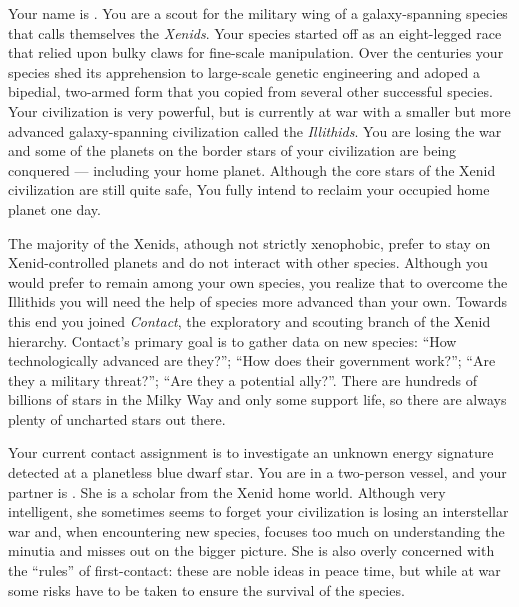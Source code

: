 \documentclass[char]{guildcamp1}
\begin{document}
\name{\cActive{}}

Your name is \cActive{\name}. You are a scout for the military wing of a galaxy-spanning species that calls themselves the \emph{Xenids}. Your species started off as an eight-legged race that relied upon bulky claws for fine-scale manipulation. Over the centuries your species shed its apprehension to large-scale genetic engineering and adoped a bipedial, two-armed form that you copied from several other successful species. Your civilization is very powerful, but is currently at war with a smaller but more advanced galaxy-spanning civilization called the \emph{Illithids}. You are losing the war and some of the planets on the border stars of your civilization are being conquered --- including your home planet. Although the core stars of the Xenid civilization are still quite safe, You fully intend to reclaim your occupied home planet one day.

The majority of the Xenids, athough not strictly xenophobic, prefer to stay on Xenid-controlled planets and do not interact with other species. Although you would prefer to remain among your own species, you realize that to overcome the Illithids you will need the help of species more advanced than your own. Towards this end you joined \emph{Contact}, the exploratory and scouting branch of the Xenid hierarchy. Contact's primary goal is to gather data on new species: ``How technologically advanced are they?''; ``How does their government work?''; ``Are they a military threat?''; ``Are they a potential ally?''. There are hundreds of billions of stars in the Milky Way and only some support life, so there are always plenty of uncharted stars out there.

Your current contact assignment is to investigate an unknown energy signature detected at a planetless blue dwarf star. You are in a two-person vessel, and your partner is \cPassive{\name}. She is a scholar from the Xenid home world. Although very intelligent, she sometimes seems to forget your civilization is losing an interstellar war and, when encountering new species, focuses too much on understanding the minutia and misses out on the bigger picture. She is also overly concerned with the ``rules'' of first-contact: these are noble ideas in peace time, but while at war some risks have to be taken to ensure the survival of the species.
\end{document}

